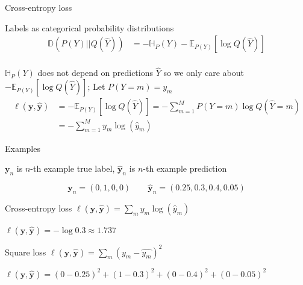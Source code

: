 \documentclass[12pt]{beamer}
\begin{document}
\begin{frame}{Cross-entropy loss}

Labels as categorical probability distributions
\begin{align*}
\mathbb{D}(P(Y) || Q(\hat{Y})) &= - \mathbb{H}_{P} (Y)  - \mathbb{E}_{P(Y)} \left[ \log Q(\hat{Y}) \right] \\
\end{align*}

$\mathbb{H}_{P} (Y)$ does not depend on predictions $\hat{Y}$ so we only care about $- \mathbb{E}_{P(Y)} \left[ \log Q(\hat{Y}) \right]$; Let $P(Y = m) = y_m$
\begin{align*}
\ell(\mathbf{y}, \hat{\mathbf{y}}) &= 
- \mathbb{E}_{P(Y)} \left[ \log Q(\hat{Y}) \right]
= - \sum_{m = 1}^{M} P(Y = m) \log Q(\hat{Y} = m)\\
&=-  \sum_{m = 1}^{M} y_m \log (\hat{y}_m) 
\end{align*}


\end{frame}


\begin{frame}{Examples}

$\mathbf{y}_n$ is $n$-th example true label, $\hat{\mathbf{y}}_n$ is $n$-th example prediction

$$\mathbf{y}_n = (0, 1, 0, 0) \qquad \hat{\mathbf{y}}_n = (0.25, 0.3, 0.4, 0.05)$$

Cross-entropy loss $\ell(\mathbf{y}, \hat{\mathbf{y}}) = \sum_{m} y_m \log (\hat{y}_m)$

$\ell(\mathbf{y}, \hat{\mathbf{y}}) = - \log 0.3 \approx 1.737$

\bigskip

Square loss $\ell(\mathbf{y}, \hat{\mathbf{y}}) =  \sum_{m} (y_m - \hat{y_m})^2$

$\ell(\mathbf{y}, \hat{\mathbf{y}}) = (0-0.25)^2 + (1 - 0.3)^2 + (0-0.4)^2 + (0 - 0.05)^2$


\end{frame}
\end{document}
